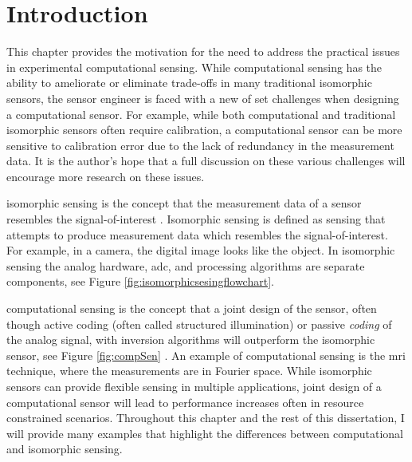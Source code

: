 \chapter{Introduction}\label{chap:Introduction}


This chapter provides the motivation for the need to address the practical issues in experimental computational sensing. While computational sensing has the ability to ameliorate or eliminate trade-offs in many traditional isomorphic sensors, the sensor engineer is faced with a new of set challenges when designing a computational sensor. For example, while both computational and traditional isomorphic sensors often require calibration, a computational sensor can be more sensitive to calibration error due to the lack of redundancy in the measurement data. It is the author's hope that a full discussion on these various challenges will encourage more research on these issues. 

\Gls{isomorphic sensing} is the concept that the measurement data of a sensor resembles the signal-of-interest \cite{brady2009optical}. Isomorphic sensing is defined as sensing that attempts to produce measurement data which resembles the signal-of-interest. For example, in a camera, the digital image looks like the object. In isomorphic sensing the analog hardware, \acrfull{adc}, and processing algorithms are separate components, see Figure \ref{fig:isomorphicsesingflowchart}.  

\Gls{computational sensing} is the concept that a joint design of the sensor, often though active \gls{coding} (often called structured illumination) or passive \emph{coding} of the analog signal, with inversion algorithms will outperform the isomorphic sensor, see Figure \ref{fig:compSen} \cite{neifeld2006taskSpecificSensing}. An example of computational sensing is the \gls{mri} technique, where the measurements are in Fourier space. While \gls{isomorphic} sensors can provide flexible sensing in multiple applications, joint design of a \gls{computational sensor} will lead to performance increases often in resource constrained scenarios. Throughout this chapter and the rest of this dissertation, I will provide many examples that highlight the differences between computational and isomorphic sensing. 



